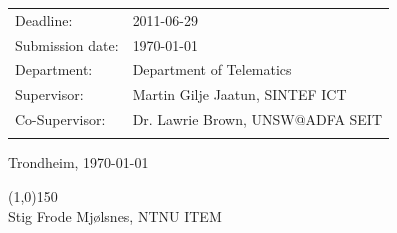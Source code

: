 \begin{titlepage}
\begin{center}
{{\begin{tabular}{p{15cm}}
\end{tabular}  }}

\begin{tabular}{ p{4cm} p{11cm}}
Deadline: & 2011-06-29 \\
Submission date: & \today \\
Department: & Department of Telematics \\
Supervisor: & Martin Gilje Jaatun, SINTEF ICT \\
Co-Supervisor: & Dr. Lawrie Brown, UNSW@ADFA SEIT \\\\
\end{tabular}
\vspace{0.5cm}

Trondheim, \today 

\vspace{1cm}
\line(1,0){150} \\
Stig Frode Mj{\o}lsnes, NTNU ITEM

\end{center}
\end{titlepage}

